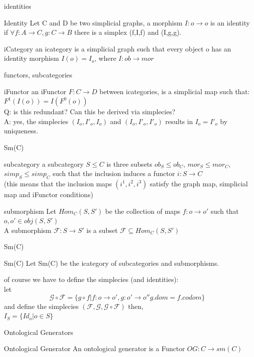 \documentclass[11pt]{beamer}
\begin{document}
\begin{frame}{identities}
    \begin{block}{Identity}
        Let C and D be two simplicial graphs, a morphism $I:o \to o$ is an identity if $\forall f:A \to C, g:C \to B$ there is a simplex (f,I,f) and (I,g,g). 
    \end{block}
    \begin{block}{iCategory}
    an icategory is a simplicial graph such that every object o has an identity morphism $I(o) = I_o$, where $I:ob \to mor$
    \end{block}
\end{frame}

\begin{frame}{functors, subcategories}
    \begin{block}{iFunctor}
        an iFunctor $F:C \to D$ between icategories, is a simplicial map such that:\\
        $F^1(I(o)) = I(F^0(o))$\\
        Q: is this redundant? Can this be derived via simplecies?\\
        A: yes, the simplecies $(I_o,I'_o,I_o)$ and $(I_o,I'_o,I'_o)$ results in $I_o = I'_o$ by uniqueness.
    \end{block}
\end{frame}

\begin{frame}{Sm(C)}
    \begin{block}{subcategory}
    a subcategory $S\leq C$ is three subsets $ob_S\leq ob_C$, $mor_S \leq mor_C$, $simp_S \leq simp_C$ such that the inclusion induces a functor $i:S \to C$ \\
    (this means that the inclusion maps $(i^1,i^2,i^3)$ satisfy the graph map, simplicial map and iFunctor conditions)
    \end{block}
    \begin{block}{submorphism}
    Let $Hom_{C}(S,S')$ be the collection of maps $f:o \to o'$ such that $o,o' \in obj(S,S')$\\
    A submorphism $\mathcal F: S \to  S'$ is a subset $\mathcal F \subseteq Hom_{C}(S,S')$
    \end{block}
\end{frame}

\begin{frame}{Sm(C)}
\begin{block}{Sm(C)}
Let Sm(C) be the icategory of subcategories and submorphisms. 
\end{block}

of course we have to define the simplecies (and identities):\\
let $$\mathcal G \circ \mathcal F = \{g\circ f|f:o \to o',g:o' \to o'' g.dom = f.codom\}$$ and define the simplecies $(\mathcal F,\mathcal G,\mathcal G \circ \mathcal F)$ then,\\
$I_S = \{Id_o|o\in S\}$
\end{frame}

\begin{frame}{Ontological Generators}
\begin{block}{Ontological Generator}
An ontological generator is a Functor $OG: C \to sm(C) $
\end{block}
    
\end{frame}
\end{document}
